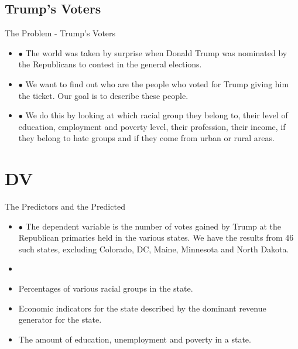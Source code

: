 \documentclass{beamer}
\begin{document}

\subsection[The Problem]{Trump's Voters}

\begin{frame}{The Problem - Trump's Voters}

\begin{itemize}

\item {} {$\bullet$ The world was taken by surprise when Donald Trump was nominated by the Republicans to contest in the general elections.
}

\item {} {$\bullet$ We want to find out who are the people who voted for Trump giving him the ticket. Our goal is to describe these people.}

\item {} {$\bullet$ We do this by looking at which racial group they belong to, their level of education, employment and poverty level, their profession, their income, if they belong to hate groups and if they come from urban or rural areas. }

\end{itemize}

\end{frame}


\section[Data and Variables]{DV}

\begin{frame}{The Predictors and the Predicted}

\begin{itemize}

\item {} {$\bullet$ The dependent variable is the number of votes gained by Trump at the Republican primaries held in the various states. We have the results from 46 such states, excluding Colorado, DC, Maine, Minnesota and North Dakota. }

\item {}

\item {} {Percentages of various racial groups in the state.}
\item {} {Economic indicators for the state described by the dominant revenue generator for the state.}
\item {} {The amount of education, unemployment and poverty in a state.}

\end{itemize}

\end{frame}
\end{document}
